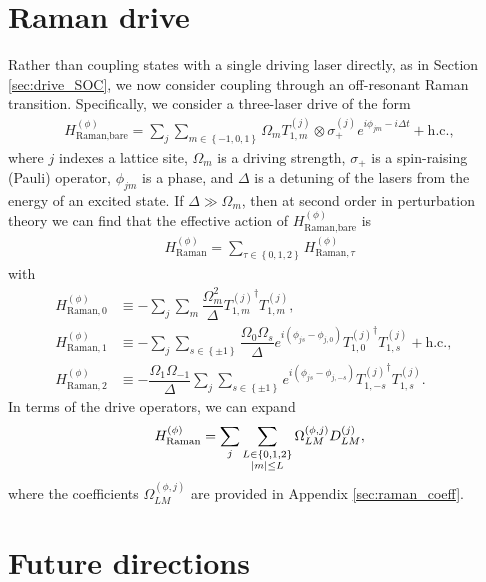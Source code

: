 \documentclass[nofootinbib,notitlepage,11pt]{revtex4-2}
\renewcommand{\t}{\text} %
\newcommand{\f}[2]{\dfrac{#1}{#2}} %
\newcommand{\p}[1]{\left(#1\right)} %
\renewcommand{\set}[1]{\left\{#1\right\}} %
\newcommand{\1}{\mathds{1}}
\begin{document}
\section{Raman drive}
\label{sec:raman}

Rather than coupling states with a single driving laser directly, as
in Section \ref{sec:drive_SOC}, we now consider coupling through an
off-resonant Raman transition.  Specifically, we consider a
three-laser drive of the form
\begin{align}
  H_{\t{Raman,bare}}^{(\phi)}
  = \sum_j \sum_{m\in\set{-1,0,1}} \Omega_m T_{1,m}^{(j)}
  \otimes \sigma_+^{(j)} e^{i\phi_{jm}-i\Delta t} + \t{h.c.},
\end{align}
where $j$ indexes a lattice site, $\Omega_m$ is a driving
strength, $\sigma_+$ is a spin-raising (Pauli) operator, $\phi_{jm}$
is a phase, and $\Delta$ is a detuning of the lasers from the energy
of an excited state.  If $\Delta\gg\Omega_m$, then at second
order in perturbation theory we can find that the effective action of
$H_{\t{Raman,bare}}^{(\phi)}$ is
\begin{align}
  H_{\t{Raman}}^{(\phi)}
  = \sum_{\tau\in\set{0,1,2}} H_{\t{Raman},\tau}^{(\phi)}
\end{align}
with
\begin{align}
  H_{\t{Raman},0}^{(\phi)}
  &\equiv -\sum_j\sum_m \f{\Omega_m^2}{\Delta}
  {T_{1,m}^{(j)}}^\dag T_{1,m}^{(j)}, & \label{eq:raman_0} \\
  H_{\t{Raman},1}^{(\phi)}
  &\equiv -\sum_j\sum_{s\in\set{\pm1}}
  \f{\Omega_0\Omega_s}{\Delta}
  e^{i\p{\phi_{js}-\phi_{j,0}}}{T_{1,0}^{(j)}}^\dag T_{1,s}^{(j)} + \t{h.c.},
  \\
  H_{\t{Raman},2}^{(\phi)}
  &\equiv -\f{\Omega_1\Omega_{-1}}{\Delta}
  \sum_j\sum_{s\in\set{\pm1}}
  e^{i\p{\phi_{js}-\phi_{j,-s}}} {T_{1,-s}^{(j)}}^\dag T_{1,s}^{(j)}.
  \label{eq:raman_2}
\end{align}
In terms of the drive operators, we can expand
\begin{align}
  H_{\t{Raman}}^{(\phi)}
  = \sum_j \sum_{\substack{L\in\set{0,1,2}\\\abs{m}\le L}}
  \Omega_{LM}^{(\phi,j)} D_{LM}^{(j)},
\end{align}
where the coefficients $\Omega_{LM}^{(\phi,j)}$ are provided in
Appendix \ref{sec:raman_coeff}.


\section{Future directions}
\end{document}
